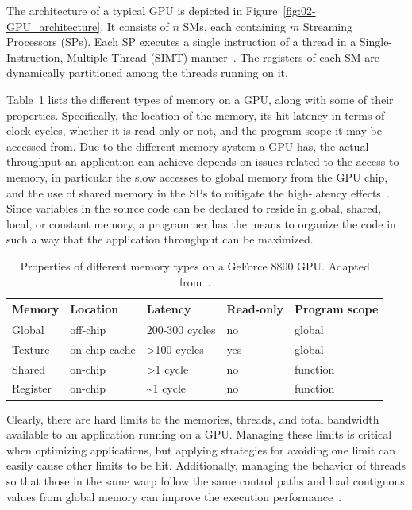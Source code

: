 The architecture of a typical GPU is depicted in Figure~\ref{fig:02-GPU_architecture}.
It consists of $n$ SMs, each containing $m$ Streaming Processors
(SPs). Each SP executes
a single instruction of a thread in a Single-Instruction, Multiple-Thread
(SIMT)
manner~\cite{Cruz-How_to_obtain_efficient_GPU_kernels:2011}. The
registers of each SM are dynamically partitioned among the threads
running on it. 

Table~\ref{tab:02-GPU_memory_properties} lists the different types
of memory on a GPU, along with some of their properties. Specifically,
the location of the memory, its hit-latency in terms of clock cycles,
whether it is read-only or not, and the program scope it may be accessed
from. Due to the different memory system a GPU has, the actual throughput
an application can achieve depends on issues related to the access
to memory, in particular the slow accesses to global memory from the
GPU chip, and the use of shared memory in the SPs to mitigate the
high-latency effects~\cite{Cruz-How_to_obtain_efficient_GPU_kernels:2011}.
Since variables in the source code can be declared to reside in global,
shared, local, or constant memory, a programmer has the means to organize
the code in such a way that the application throughput can be maximized.

\begin{table}
\caption{Properties of different memory types on a GeForce 8800 GPU. Adapted
from~\cite{Ryoo-Optimization_principles_of_a_GPU_using_CUDA:2008}.\label{tab:02-GPU_memory_properties}}


\centering

\begin{tabular}{lllll}
\hline 
Memory & Location & Latency & Read-only & Program scope\tabularnewline[\doublerulesep]
\hline 
Global & off-chip & 200-300 cycles & no & global\tabularnewline
Texture & on-chip cache & >100 cycles & yes & global\tabularnewline
Shared & on-chip & >1 cycle & no & function\tabularnewline
Register & on-chip & \textasciitilde{}1 cycle & no & function\tabularnewline
\hline 
\end{tabular}
\end{table}


Clearly, there are hard limits to the memories, threads, and total
bandwidth available to an application running on a GPU. Managing these
limits is critical when optimizing applications, but applying strategies
for avoiding one limit can easily cause other limits to be hit. Additionally,
managing the behavior of threads so that those in the same warp follow
the same control paths and load contiguous values from global memory
can improve the execution performance~\cite{Ryoo-Optimization_principles_of_a_GPU_using_CUDA:2008}.


